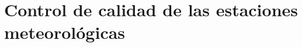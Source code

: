 \documentclass[11pt]{article}
\def\celc{$^{\circ}C$ }%
\begin{document}





\section{Control de calidad de las estaciones meteorológicas}
\end{document}
